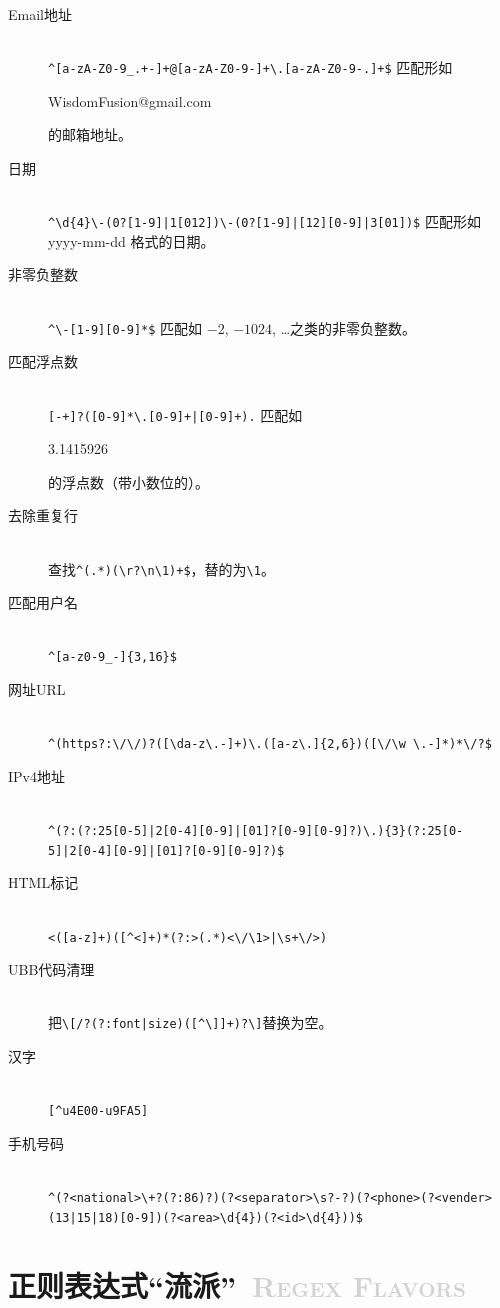 \documentclass[12pt,a4paper,twoside]{ctexart}
\newcommand{\cbmatch}[1]{\colorbox{cyan!35}{\strut #1}}
\begin{document}
\begin{description}
\item[Email地址] \hfill \\
  \verb=^[a-zA-Z0-9_.+-]+@[a-zA-Z0-9-]+\.[a-zA-Z0-9-.]+$= 匹配形如 \cbmatch{WisdomFusion@gmail.com} 的邮箱地址。
\item[日期] \hfill \\
  \verb=^\d{4}\-(0?[1-9]|1[012])\-(0?[1-9]|[12][0-9]|3[01])$= 匹配形如 yyyy-mm-dd 格式的日期。
\item[非零负整数] \hfill \\
  \verb=^\-[1-9][0-9]*$= 匹配如 $-2$, $-1024$, \ldots 之类的非零负整数。
\item[匹配浮点数] \hfill \\
  \verb=[-+]?([0-9]*\.[0-9]+|[0-9]+).= 匹配如 \cbmatch{3.1415926} 的浮点数（带小数位的）{}。
\item[去除重复行] \hfill \\
  查找\verb=^(.*)(\r?\n\1)+$=，替的为\verb"\1"。
\item[匹配用户名] \hfill \\
  \verb=^[a-z0-9_-]{3,16}$=
\item[网址URL] \hfill \\
  \verb=^(https?:\/\/)?([\da-z\.-]+)\.([a-z\.]{2,6})([\/\w \.-]*)*\/?$=
\item[IPv4地址] \hfill \\
  \verb=^(?:(?:25[0-5]|2[0-4][0-9]|[01]?[0-9][0-9]?)\.){3}(?:25[0-5]|2[0-4][0-9]|[01]?[0-9][0-9]?)$=
\item[HTML标记] \hfill \\
  \verb=<([a-z]+)([^<]+)*(?:>(.*)<\/\1>|\s+\/>)=
\item[UBB代码清理] \hfill \\
  把\verb=\[/?(?:font|size)([^\]]+)?\]=替换为空。
\item[汉字] \hfill \\
  \verb=[^u4E00-u9FA5]=
\item[手机号码] \hfill \\
  \verb=^(?<national>\+?(?:86)?)(?<separator>\s?-?)(?<phone>(?<vender>(13|15|18)[0-9])(?<area>\d{4})(?<id>\d{4}))$=
\end{description}

\section[正则表达式“流派”]{正则表达式“流派”~\textcolor{lightgray}{\textsc{Regex Flavors}}}
\label{sec:flavor}
\end{document}
